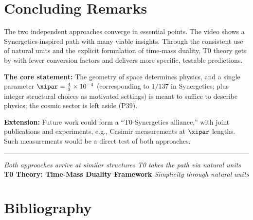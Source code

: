 	\section{Concluding Remarks}
	
	The two independent approaches converge in essential points. The video shows a Synergetics-inspired path with many viable insights. Through the consistent use of natural units and the explicit formulation of time-mass duality, T0 theory gets by with fewer conversion factors and delivers more specific, testable predictions.
	
	\textbf{The core statement:} The geometry of space determines physics, and a single parameter $\xipar = \frac{4}{3} \times 10^{-4}$ (corresponding to $1/137$ in Synergetics; plus integer structural choices as motivated settings) is meant to suffice to describe physics; the cosmic sector is left aside (P39).
	
	\textbf{Extension:} Future work could form a ``T0-Synergetics alliance,'' with joint publications and experiments, e.g., Casimir measurements at $\xipar$ lengths. Such measurements would be a direct test of both approaches.
	
	\vfill
	
	\begin{center}
		\hrule
		\vspace{0.5cm}
		\textit{Both approaches arrive at similar structures}
		\textit{T0 takes the path via natural units}
		\vspace{0.3cm}
		\textbf{T0 Theory: Time-Mass Duality Framework}
		\textit{Simplicity through natural units}
		\vspace{0.3cm}
	\end{center}
	
	\section{Bibliography}
	
